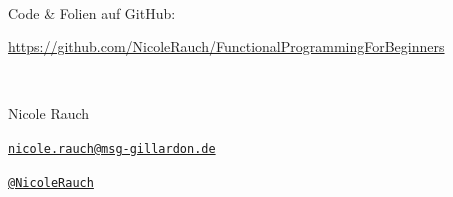 {
\begin{frame}{}

        ~\\[4em]
        Code \& Folien auf GitHub:
        \begin{center}
                \url{https://github.com/NicoleRauch/FunctionalProgrammingForBeginners}
        \end{center}

        ~\\[1em]
        \begin{block}{Nicole Rauch}
        \begin{description}[Twitterxx]
                \item[E-Mail]  \href{mailto:nicole.rauch@msg-gillardon.de}{\texttt{nicole.rauch@msg-gillardon.de}}
                \item[Twitter] \href{http://twitter.com/NicoleRauch}{\texttt{@NicoleRauch}}
        \end{description}
        \end{block}
\end{frame}
}
